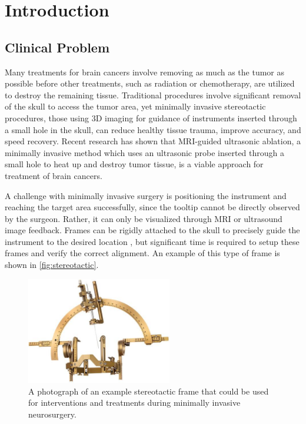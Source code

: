 \documentclass[12pt]{report}
\begin{document}
\todototoc
\listoftodos


\clearpage



\setcounter{page}{1}

\chapter{Introduction}
\label{sec:intro}
\section{Clinical Problem}
Many treatments for brain cancers involve removing as much as the tumor as possible before other treatments, such as radiation or chemotherapy, are utilized to destroy the remaining tissue. Traditional procedures involve significant removal of the skull to access the tumor area, yet minimally invasive stereotactic procedures, those using 3D imaging for guidance of instruments inserted through a small hole in the skull, can reduce healthy tissue trauma, improve accuracy, and speed recovery. \cite{texasOncology}  Recent research has shown that MRI-guided ultrasonic ablation, a minimally invasive method which uses an ultrasonic probe inserted through a small hole to heat up and destroy tumor tissue, is a viable approach for treatment of brain cancers. \cite{thermalMRIAblation} 

A challenge with minimally invasive surgery is positioning the instrument and reaching the target area successfully, since the tooltip cannot be directly observed by the surgeon. Rather, it can only be visualized through MRI or ultrasound image feedback. Frames can be rigidly attached to the skull to precisely guide the instrument to the desired location \cite{texasOncology}, but significant time is required to setup these frames and verify the correct alignment. An example of this type of frame is shown in \autoref{fig:stereotactic}.

\begin{figure}[thpb]
	\centering
	\includegraphics[width = 2.5in]{images/stereo_tactic_frame.jpg}
    \caption{A photograph of an example stereotactic frame that could be used for interventions and treatments during minimally invasive neurosurgery. \cite{stereotactic}}
    \label{fig:stereotactic}
\end{figure}
\end{document}
